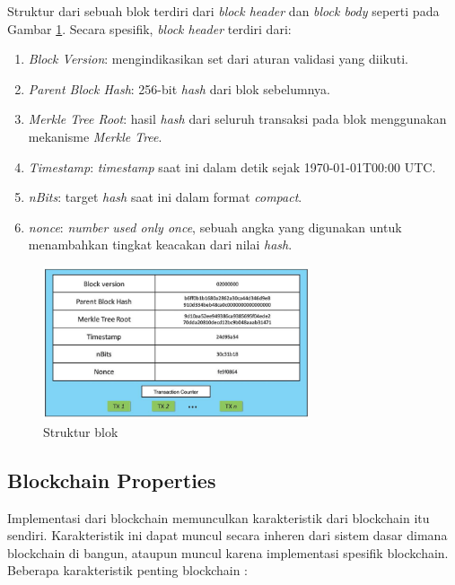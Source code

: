 \break

Struktur dari sebuah blok terdiri dari \textit{block header} dan \textit{block body} seperti pada Gambar \ref{image:struktur-blok}. Secara spesifik, \textit{block header} terdiri dari:

\begin{enumerate}
	\item \textit{Block Version}: mengindikasikan set dari aturan validasi yang diikuti.
	\item \textit{Parent Block Hash}: 256-bit \textit{hash} dari blok sebelumnya.
	\item \textit{Merkle Tree Root}: hasil \textit{hash} dari seluruh transaksi pada blok menggunakan mekanisme \textit{Merkle Tree}.
	\item \textit{Timestamp}: \textit{timestamp} saat ini dalam detik sejak 1970-01-01T00:00 UTC.
	\item \textit{nBits}: target \textit{hash} saat ini dalam format \textit{compact}.
	\item \textit{nonce}: \textit{number used only once}, sebuah angka yang digunakan untuk menambahkan tingkat keacakan dari nilai \textit{hash}.
\end{enumerate}

\begin{figure}
	\centering
	\includegraphics[width=0.7\textwidth]{resources/chapter-2/struktur-block.png}
	\caption{Struktur blok \parencite{zheng2018blockchain}}
	\label{image:struktur-blok}
\end{figure}

\subsection{Blockchain Properties}
\label{subsec:blockchain-properties}

Implementasi dari blockchain memunculkan karakteristik dari blockchain itu sendiri. Karakteristik ini dapat muncul secara inheren dari sistem dasar dimana blockchain di bangun, ataupun muncul karena implementasi spesifik blockchain. Beberapa karakteristik penting blockchain \parencite{aimar2023extraction}:

